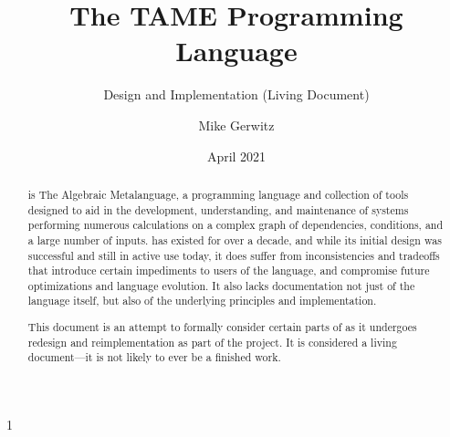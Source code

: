 \documentclass[draft,toc=index]{scrartcl}
\title{The TAME Programming Language}
\subtitle{Design and Implementation (Living Document)}
\author{Mike Gerwitz}
\date{April 2021}%
\begin{document}
\maketitle

\begin{abstract}
  \tame{} is The Algebraic Metalanguage, a programming language and
  collection of tools designed to aid in the development, understanding,
  and maintenance of systems performing numerous calculations on a
  complex graph of dependencies, conditions, and a large number of
  inputs.  \tame{} has existed for over a decade, and while its initial
  design was successful and still in active use today, it does suffer
  from inconsistencies and tradeoffs that introduce certain impediments
  to users of the language, and compromise future optimizations and
  language evolution.  It also lacks documentation not just of the
  language itself, but also of the underlying principles and
  implementation.

  This document is an attempt to formally consider certain parts of
  \tame{} as it undergoes redesign and reimplementation as part of the
  \tamer{} project.  It is considered a living document---it is not
  likely to ever be a finished work.
\end{abstract}


\tableofcontents




\let\WITHAPPENDIX1

\ifx\WITHAPPENDIX1
\clearpage
\appendix

\fi

\cfoot[\thepage]{\thepage}
\clearpage
\printindex
\end{document}
